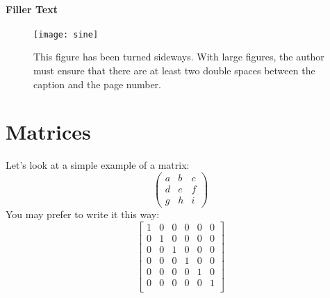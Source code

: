 \paragraph{Filler Text} \lipsum[12-15]

\thispagestyle{lscapedplain}
\begin{landscape}
\begin{figure}
\centering
  \texttt{[image: sine]}%
\caption{This figure has been turned sideways.  With large figures, 
         the author must ensure that there are at least two double spaces
         between the caption and the page number.}
\label{fig:hist}
\end{figure}
\end{landscape}
\restoregeometry
\pagestyle{plain}
\thispagestyle{plain}


\section{Matrices}
Let's look at a simple example of a matrix:
\[ \left( \begin{array}{ccc}
a & b & c \\
d & e & f \\
g & h & i \end{array} \right)\] 
%
You may prefer to write it this way:
\[ \left[\begin{array} {cccccc}
1 & 0 & 0 & 0 & 0 & 0 \\
0 & 1 & 0 & 0 & 0 & 0 \\
0 & 0 & 1 & 0 & 0 & 0 \\
0 & 0 & 0 & 1 & 0 & 0 \\
0 & 0 & 0 & 0 & 1 & 0 \\
0 & 0 & 0 & 0 & 0 & 1 \\
\end{array} \right] \]
